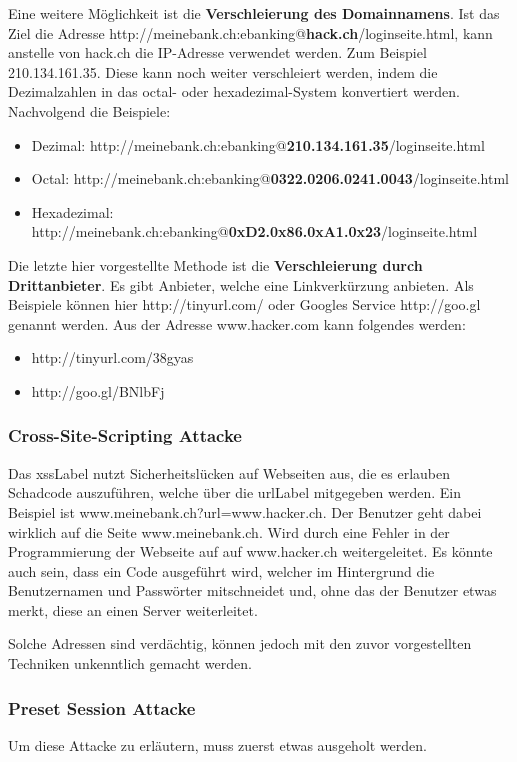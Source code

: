 Eine weitere Möglichkeit ist die \textbf{Verschleierung des Domainnamens}. Ist das Ziel die Adresse http://meinebank.ch:ebanking@\textbf{hack.ch}/loginseite.html, kann anstelle von hack.ch die IP-Adresse verwendet werden. Zum Beispiel 210.134.161.35. Diese kann noch weiter verschleiert werden, indem die Dezimalzahlen in das octal- oder hexadezimal-System konvertiert werden. Nachvolgend die Beispiele:
\begin{itemize}
\item Dezimal: http://meinebank.ch:ebanking@\textbf{210.134.161.35}/loginseite.html
\item Octal:  http://meinebank.ch:ebanking@\textbf{0322.0206.0241.0043}/loginseite.html
\item Hexadezimal:  http://meinebank.ch:ebanking@\textbf{0xD2.0x86.0xA1.0x23}/loginseite.html
\end{itemize}

Die letzte hier vorgestellte Methode ist die \textbf{Verschleierung durch Drittanbieter}. Es gibt Anbieter, welche eine Linkverkürzung anbieten. Als Beispiele können hier http://tinyurl.com/ oder Googles Service http://goo.gl genannt werden. Aus der Adresse www.hacker.com kann folgendes werden:

\begin{itemize}
\item http://tinyurl.com/38gyas
\item http://goo.gl/BNlbFj
\end{itemize}

\subsubsection{Cross-Site-Scripting Attacke}
Das \Gls{xssLabel} nutzt Sicherheitslücken auf Webseiten aus, die es erlauben Schadcode auszuführen, welche über die \Gls{urlLabel} mitgegeben werden. Ein Beispiel ist www.meinebank.ch?url=www.hacker.ch. Der Benutzer geht dabei wirklich auf die Seite www.meinebank.ch. Wird durch eine Fehler in der Programmierung der Webseite auf auf www.hacker.ch weitergeleitet. Es könnte auch sein, dass ein Code ausgeführt wird, welcher im Hintergrund die Benutzernamen und Passwörter mitschneidet und, ohne das der Benutzer etwas merkt, diese an einen Server weiterleitet.

Solche Adressen sind verdächtig, können jedoch mit den zuvor vorgestellten Techniken unkenntlich gemacht werden.

\subsubsection{Preset Session Attacke}
Um diese Attacke zu erläutern, muss zuerst etwas ausgeholt werden.


